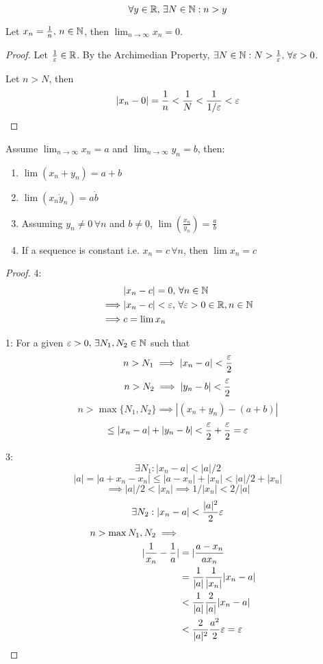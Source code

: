 \documentclass[a4paper,10pt]{article}
\begin{document}
\begin{cor}
	\[ \forall y \in \mathbb{R}, \, \exists N \in \mathbb{N} : n > y \]
\end{cor}

\begin{prop}
	Let $x_n = \frac{1}{n}, \, n \in \mathbb{N}$, then $\lim_{n \to \infty}
	x_n = 0$.
\end{prop}

\begin{proof}
	Let $\frac{1}{\varepsilon} \in \mathbb{R}$. By the Archimedian Property,
	$\exists N \in \mathbb{N} : N > \frac{1}{\varepsilon}, \, \forall \varepsilon > 0$.

	Let $n>N$, then
	\[ |x_n - 0| = \frac{1}{n} < \frac{1}{N} < \frac{1}{1/\varepsilon} < \varepsilon \]
\end{proof}

\begin{prop}
	Assume $\lim_{n \to \infty} x_n = a$ and $\lim_{n \to \infty}
	y_n = b$, then:
	\begin{enumerate}
		\item
			$\lim (x_n + y_n) = a + b$
		\item
			$\lim (x_n \dot y_n) = a \dot b$
		\item
			Assuming $y_n \neq 0 \, \forall n$ and $b \neq 0$,
			$\lim(\frac{x_n}{y_n}) = \frac{a}{b}$
		\item
			If a sequence is constant i.e. $x_n = c \,
			\forall n$, then $\lim x_n = c$
	\end{enumerate}
\end{prop}

\begin{proof}
	4:
	\begin{align*}
		&|x_n - c| = 0, \, \forall n \in \mathbb{N} \\
		\implies &|x_n - c| < \varepsilon, \, \forall \varepsilon > 0 \in \mathbb{R}, n \in \mathbb{N} \\
		\implies &c = \lim x_n
	\end{align*}

	1:
	For a given $\varepsilon > 0, \, \exists N_1, N_2 \in \mathbb{N}$ such that
	\[ n > N_1 \implies |x_n - a| < \frac{\varepsilon}{2} \]
	\[ n > N_2 \implies |y_n - b| < \frac{\varepsilon}{2} \]
	\[
		n > \max \{ N_1, N_2 \} \implies | (x_n + y_n) - (a+b)|
	\]
	\[
		\leq |x_n - a| + |y_n - b|
		< \frac{\varepsilon}{2} + \frac{\varepsilon}{2} = \varepsilon
	\]

	3:
	\[ \exists N_1 : |x_n - a| < |a|/2 \]
	\[ |a| = |a + x_n - x_n| \leq |a - x_n| + |x_n| < |a|/2 + |x_n| \]
	\[ \implies |a|/2 < |x_n| \implies 1/|x_n| < 2/|a| \]
	\[ \exists N_2 : |x_n -a| < \frac{|a|^2}{2}\varepsilon \]
	\begin{align*}
		n > \max{N_1, N_2} \implies \\
		|\frac{1}{x_n} - \frac{1}{a}| &= |\frac{a-x_n}{ax_n} \\
		&= \frac{1}{|a|}\frac{1}{|x_n|}|x_n - a| \\
		&< \frac{1}{|a|}\frac{2}{|a|}|x_n - a| \\
		&< \frac{2}{|a|^2}\frac{a^2}{2}\varepsilon = \varepsilon
	\end{align*}

\end{proof}
\end{document}
